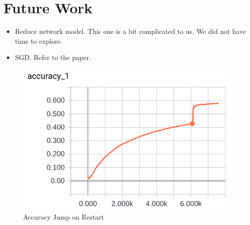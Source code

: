\documentclass[11pt]{article} %
\begin{document}
\section{Future Work}
\begin{itemize}
	\item Reduce network model.
	This one is a bit complicated to us. We did not have time to explore.
	\item SGD.
	Refer to the paper.
\end{itemize}


\begin{figure}[!htb]
	\centering
	\includegraphics[width=1.0\linewidth]{"./plot/acc_jump"}
	\caption{Accuracy Jump on Restart}
	\label{n1-ad}
\end{figure}
\end{document}

